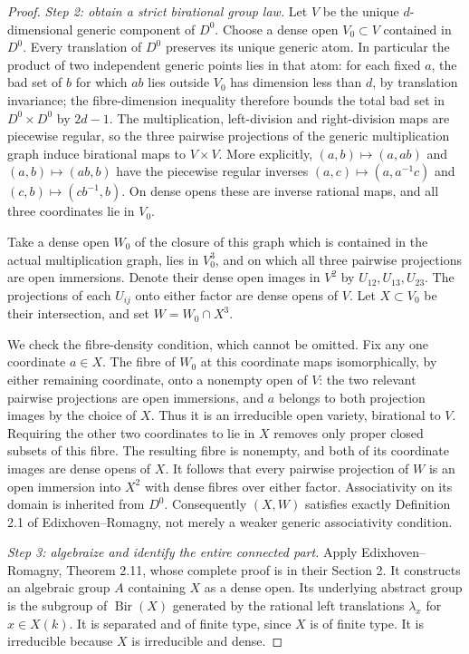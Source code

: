 \begin{proof}
\emph{Step 2: obtain a strict birational group law.}
Let $V$ be the unique $d$-dimensional generic component of $D^0$.
Choose a dense open $V_0\subset V$ contained in $D^0$.  Every translation
of $D^0$ preserves its unique generic atom.  In particular the product
of two independent generic points lies in that atom: for each fixed
$a$, the bad set of $b$ for which $ab$ lies outside $V_0$ has dimension
less than $d$, by translation invariance; the fibre-dimension inequality
therefore bounds the total bad set in $D^0\times D^0$ by $2d-1$.
The multiplication,
left-division and right-division maps are piecewise regular, so the three
pairwise projections of the generic multiplication graph induce
birational maps to $V\times V$.  More explicitly,
$(a,b)\mapsto(a,ab)$ and $(a,b)\mapsto(ab,b)$ have the piecewise regular
inverses $(a,c)\mapsto(a,a^{-1}c)$ and
$(c,b)\mapsto(cb^{-1},b)$.  On dense opens these are inverse rational
maps, and all three coordinates lie in $V_0$.

Take a dense open $W_0$ of the closure of this graph which is contained
in the actual multiplication graph, lies in $V_0^3$, and on which all
three pairwise projections are open immersions.  Denote their dense open
images in $V^2$ by $U_{12},U_{13},U_{23}$.  The projections of each
$U_{ij}$ onto either factor are dense opens of $V$.  Let $X\subset V_0$
be their intersection, and set $W=W_0\cap X^3$.

We check the fibre-density condition, which cannot be omitted.  Fix any
one coordinate $a\in X$.  The fibre of $W_0$ at this coordinate maps
isomorphically, by either remaining coordinate, onto a nonempty open of
$V$: the two relevant pairwise projections are open immersions, and
$a$ belongs to both projection images by the choice of $X$.  Thus it
is an irreducible open variety, birational to $V$.  Requiring the other
two coordinates to lie in $X$ removes only proper closed subsets of
this fibre.  The resulting fibre is nonempty, and both of its coordinate
images are dense opens of $X$.  It follows that every pairwise projection
of $W$ is an open immersion into $X^2$ with dense fibres over either
factor.  Associativity on its domain is inherited from $D^0$.
Consequently $(X,W)$ satisfies exactly Definition 2.1 of
Edixhoven--Romagny\cite[Definition 2.1, pp.~4--5]{CEdixhovenRomagny2013}, not merely a weaker generic associativity condition.

\emph{Step 3: algebraize and identify the entire connected part.}
Apply Edixhoven--Romagny, Theorem 2.11, whose complete proof is in their
Section 2\cite[Theorem 2.11 and its proof, pp.~4--7]{CEdixhovenRomagny2013}.  It constructs an algebraic group $A$ containing $X$ as a
dense open.  Its underlying abstract group is the subgroup of
$\operatorname{Bir}(X)$ generated by the rational left translations
$\lambda_x$ for $x\in X(k)$.  It is separated and of finite type, since
$X$ is of finite type.  It is irreducible because $X$ is irreducible and
dense.


\end{proof}
